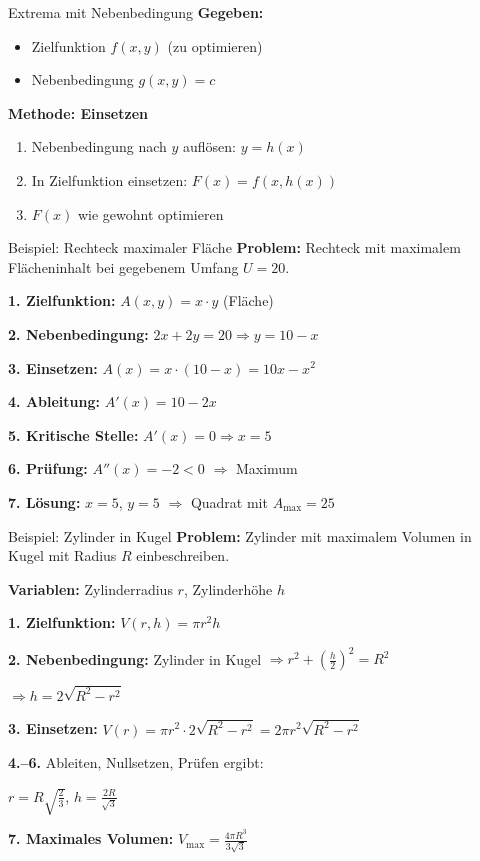 \documentclass[a4paper,fontsize = 7pt]{scrartcl}
\begin{document}
\begin{mainbox}{Extrema mit Nebenbedingung}
\textbf{Gegeben:}
\begin{itemize}
	\item Zielfunktion $f(x, y)$ (zu optimieren)
	\item Nebenbedingung $g(x, y) = c$
\end{itemize}

\textbf{Methode: Einsetzen}
\begin{enumerate}
	\item Nebenbedingung nach $y$ auflösen: $y = h(x)$
	\item In Zielfunktion einsetzen: $F(x) = f(x, h(x))$
	\item $F(x)$ wie gewohnt optimieren
\end{enumerate}
\end{mainbox}

\begin{subbox}{Beispiel: Rechteck maximaler Fläche}
\textbf{Problem:} Rechteck mit maximalem Flächeninhalt bei gegebenem Umfang $U = 20$.

\textbf{1. Zielfunktion:} $A(x, y) = x \cdot y$ (Fläche)

\textbf{2. Nebenbedingung:} $2x + 2y = 20 \Rightarrow y = 10 - x$

\textbf{3. Einsetzen:} $A(x) = x \cdot (10 - x) = 10x - x^2$

\textbf{4. Ableitung:} $A'(x) = 10 - 2x$

\textbf{5. Kritische Stelle:} $A'(x) = 0 \Rightarrow x = 5$

\textbf{6. Prüfung:} $A''(x) = -2 < 0$ $\Rightarrow$ Maximum

\textbf{7. Lösung:} $x = 5$, $y = 5$ $\Rightarrow$ Quadrat mit $A_{\max} = 25$
\end{subbox}

\begin{subbox}{Beispiel: Zylinder in Kugel}
\textbf{Problem:} Zylinder mit maximalem Volumen in Kugel mit Radius $R$ einbeschreiben.

\textbf{Variablen:} Zylinderradius $r$, Zylinderhöhe $h$

\textbf{1. Zielfunktion:} $V(r, h) = \pi r^2 h$

\textbf{2. Nebenbedingung:} Zylinder in Kugel $\Rightarrow r^2 + \left(\frac{h}{2}\right)^2 = R^2$

$\Rightarrow h = 2\sqrt{R^2 - r^2}$

\textbf{3. Einsetzen:} $V(r) = \pi r^2 \cdot 2\sqrt{R^2 - r^2} = 2\pi r^2 \sqrt{R^2 - r^2}$

\textbf{4.--6.} Ableiten, Nullsetzen, Prüfen ergibt:

$r = R\sqrt{\frac{2}{3}}$, $h = \frac{2R}{\sqrt{3}}$

\textbf{7. Maximales Volumen:} $V_{\max} = \frac{4\pi R^3}{3\sqrt{3}}$
\end{subbox}
\end{document}
